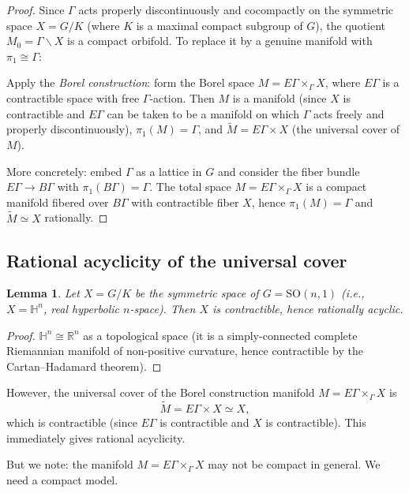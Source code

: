\documentclass[12pt]{article}
\newtheorem{lemma}[theorem]{Lemma}
\theoremstyle{definition}
\theoremstyle{remark}
\begin{document}
\begin{proof}
Since $\Gamma$ acts properly discontinuously and cocompactly on the symmetric
space $X = G/K$ (where $K$ is a maximal compact subgroup of $G$), the quotient
$M_0 = \Gamma\backslash X$ is a compact orbifold.  To replace it by a genuine
manifold with $\pi_1 \cong \Gamma$:

Apply the \emph{Borel construction}: form the Borel space
$M = E\Gamma\times_\Gamma X$, where $E\Gamma$ is a contractible space with
free $\Gamma$-action.  Then $M$ is a manifold (since $X$ is contractible and
$E\Gamma$ can be taken to be a manifold on which $\Gamma$ acts freely and
properly discontinuously), $\pi_1(M) = \Gamma$, and
$\tilde{M} = E\Gamma\times X$ (the universal cover of $M$).

More concretely: embed $\Gamma$ as a lattice in $G$ and consider the
fiber bundle $E\Gamma\to B\Gamma$ with $\pi_1(B\Gamma)=\Gamma$.  The
total space $M = E\Gamma\times_\Gamma X$ is a compact manifold fibered over
$B\Gamma$ with contractible fiber $X$, hence $\pi_1(M) = \Gamma$ and
$\tilde{M} \simeq X$ rationally.
\end{proof}

\subsection{Rational acyclicity of the universal cover}

\begin{lemma}\label{lem:acyclic}
Let $X = G/K$ be the symmetric space of $G = \mathrm{SO}(n,1)$ (i.e.,
$X = \mathbb{H}^n$, real hyperbolic $n$-space).  Then $X$ is contractible,
hence rationally acyclic.
\end{lemma}

\begin{proof}
$\mathbb{H}^n \cong \mathbb{R}^n$ as a topological space (it is a
simply-connected complete Riemannian manifold of non-positive curvature,
hence contractible by the Cartan--Hadamard theorem).
\end{proof}

However, the universal cover of the Borel construction manifold
$M = E\Gamma\times_\Gamma X$ is
\[
  \tilde{M} = E\Gamma\times X \simeq X,
\]
which is contractible (since $E\Gamma$ is contractible and $X$ is contractible).
This immediately gives rational acyclicity.

But we note: the manifold $M = E\Gamma\times_\Gamma X$ may not be compact
in general.  We need a compact model.
\end{document}
